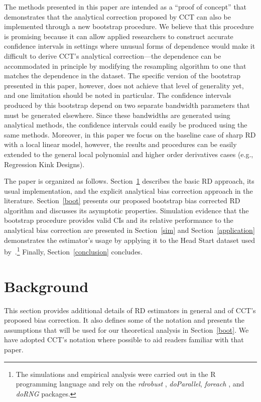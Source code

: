 \documentclass[12pt,fleqn]{article}
\begin{document}
The methods presented in this paper are intended as a ``proof of concept'' that
demonstrates that the analytical correction proposed by CCT can also be
implemented through a new bootstrap procedure. We believe that this procedure is
promising because it can allow applied researchers to construct
accurate confidence intervals in settings where unusual forms of dependence
would make it difficult to derive CCT's analytical correction---the dependence
can be accommodated in principle by modifying the resampling algorithm to one
that matches the dependence in the dataset. The specific version of the bootstrap
presented in this paper, however, does not achieve that level of generality yet,
and one limitation should be noted in particular. The confidence
intervals produced by this bootstrap depend on two separate bandwidth parameters
that must be generated elsewhere. Since these bandwidths are generated using
analytical methods, the confidence intervals could easily be produced using the
same methods. Moreover, in this paper we focus on the baseline case of
sharp RD with a local linear model, however, the results and procedures can be easily extended to the general local polynomial
and higher order derivatives cases (e.g., Regression Kink Designs).

The paper is organized as follows. Section~\ref{background} describes the basic
RD approach, its usual implementation, and the explicit analytical bias
correction approach in the literature. Section~\ref{boot} presents our proposed
bootstrap bias corrected RD algorithm and discusses its asymptotic
properties. Simulation evidence that the bootstrap procedure provides valid CIs
and its relative performance to the analytical bias correction are presented in
Section~\ref{sim} and Section~\ref{application} demonstrates the estimator's
usage by applying it to the Head Start dataset used
by~\cite{ludwig2007}.\footnote{%
  The simulations and empirical analysis were carried out in the R programming
  language \citep{R} and rely on the \textit{rdrobust} \citep{rdrobust},
  \textit{doParallel}, \textit{foreach} \citep{doparallel,foreach}, and
  \textit{doRNG} \citep{dorng} packages.} %
Finally, Section~\ref{conclusion} concludes.

\section{Background}\label{background}

This section provides additional details of RD estimators in general and of
CCT's proposed bias correction. It also defines some of the notation and
presents the assumptions that will be used for our theoretical analysis in
Section~\ref{boot}. We have adopted CCT's notation where possible to aid
readers familiar with that paper.
\end{document}
